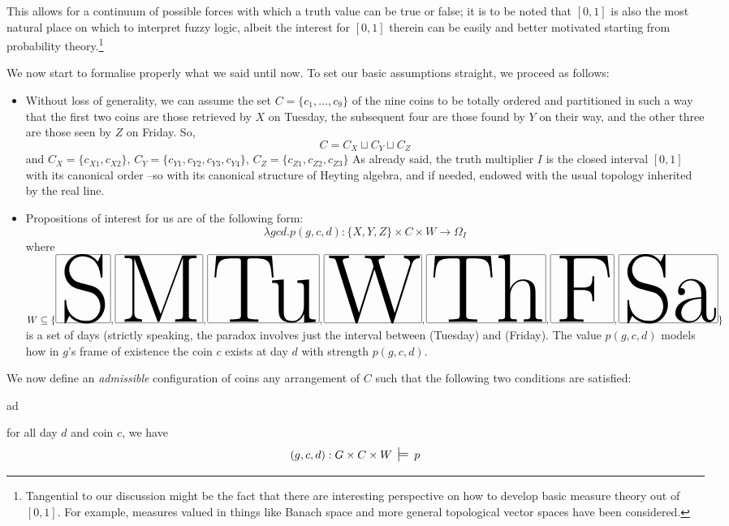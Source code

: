 \begin{example}
\begin{remark}
    This allows for a continuum of possible forces with which a truth value can be true or false;  it is to be noted that $[0,1]$ is also the most natural place on which to interpret fuzzy logic, albeit the interest for $[0,1]$ therein can be easily and better motivated starting from probability theory.\footnote{Tangential to our discussion might be the fact that there are interesting perspective on how to develop basic measure theory out of $[0,1]$. For example, measures valued in things like Banach space and more general topological  vector spaces have been considered.}
  \end{remark}
  We now start to formalise properly what we said until now. To set our basic assumptions straight, we proceed as follows:
  \begin{itemize}
    \item Without loss of generality, we can assume the set $C = \{c_1,\dots,c_9\}$ of the nine coins to be totally ordered and partitioned in such a way that the first two coins are those retrieved by $X$ on Tuesday, the subsequent four are those found by $Y$ on their way, and the other three are those seen by $Z$ on Friday. So,
          \[C = C_X \sqcup C_Y \sqcup C_Z\]
          and $C_X = \{c_{X1}, c_{X2}\}$, $C_Y = \{c_{Y1},c_{Y2},c_{Y3},c_{Y4}\}$, $C_Z= \{c_{Z1}, c_{Z2}, c_{Z3}\}$ As already said, the truth multiplier $I$ is the closed interval $[0,1]$ with its canonical order --so with its canonical structure of Heyting algebra, and if needed, endowed with the usual topology inherited by the real line.
    \item Propositions of interest for us are of the following form:
          \[\lambda gcd.p(g, c, d) : \{X,Y,Z\}\times C\times W \to \Omega_I\]
          where $W \subseteq \{\S,\M,\Tu,\W, \Th,\F,\Sa\}$ is a set of days (strictly speaking, the paradox involves just the interval between \Tu (Tuesday) and \F (Friday). The value $p(g,c,d)$ models how in $g$'s frame of existence the coin $c$ exists at day $d$ with strength $p(g,c,d)$.
  \end{itemize}
  \begin{definition}
    We now define an \emph{admissible} configuration of coins any arrangement of $C$ such that the following two conditions are satisfied:
    \begin{enumtag}{ad}
      \item \label{ad:uno} for all day $d$ and coin $c$, we have
      \[
      (g,c,d) : G\times C\times W \entails{} p  
\]
\end{enumtag}
\end{definition}
\end{example}
